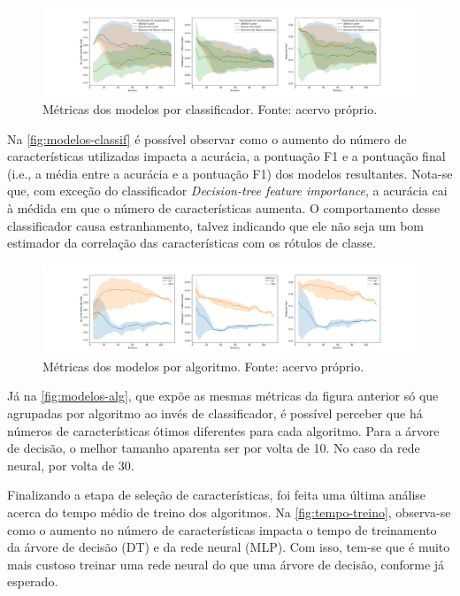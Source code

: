 \documentclass[12pt]{article}
\begin{document}
\begin{figure}[t!]
    \includegraphics[width=\linewidth]{figures/modelos_por_classificador}
    \caption{Métricas dos modelos por classificador. Fonte: acervo próprio.}
    \label{fig:modelos-classif}
\end{figure}

Na \autoref{fig:modelos-classif} é possível observar como o aumento do número de características utilizadas impacta a acurácia, a pontuação F1 e a pontuação final (i.e., a média entre a acurácia e a pontuação F1) dos modelos resultantes. Nota-se que, com exceção do classificador \textit{Decision-tree feature importance}, a acurácia cai à médida em que o número de características aumenta. O comportamento desse classificador causa estranhamento, talvez indicando que ele não seja um bom estimador da correlação das características com os rótulos de classe.

\begin{figure}[t!]
    \includegraphics[width=\linewidth]{figures/modelos_por_algoritmo}
    \caption{Métricas dos modelos por algoritmo. Fonte: acervo próprio.}
    \label{fig:modelos-alg}
\end{figure}

Já na  \autoref{fig:modelos-alg}, que expõe as mesmas métricas da figura anterior só que agrupadas por algoritmo ao invés de classificador, é possível perceber que há números de características ótimos diferentes para cada algoritmo. Para a árvore de decisão, o melhor tamanho aparenta ser por volta de 10. No caso da rede neural, por volta de 30.

Finalizando a etapa de seleção de características, foi feita uma última análise acerca do tempo médio de treino dos algoritmos. Na  \autoref{fig:tempo-treino}, observa-se como o aumento no número de características impacta o tempo de treinamento da árvore de decisão (DT) e da rede neural (MLP). Com isso, tem-se que é muito mais custoso treinar uma rede neural do que uma árvore de decisão, conforme já esperado. 
\end{document}
